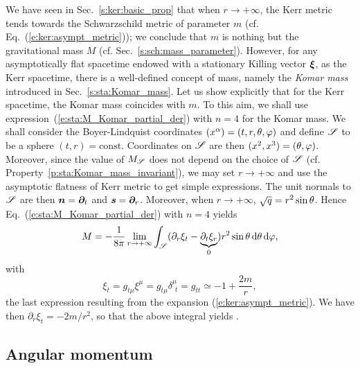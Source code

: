 We have seen in Sec.~\ref{s:ker:basic_prop} that when
$r\rightarrow +\infty$, the Kerr metric tends towards the Schwarzschild
metric of parameter $m$ (cf. Eq.~(\ref{e:ker:asympt_metric}));
we conclude that $m$ is nothing but the gravitational mass $M$ (cf.
Sec.~\ref{s:sch:mass_parameter}).
However, for any asymptotically flat spacetime endowed with
a stationary Killing vector $\bm{\xi}$, as the Kerr spacetime,
there is a well-defined concept of mass, namely the \emph{Komar mass}
introduced in Sec.~\ref{s:sta:Komar_mass}.
Let us show explicitly that for the Kerr spacetime, the Komar mass coincides with $m$.
To this aim, we shall use expression~(\ref{e:sta:M_Komar_partial_der}) with $n=4$
for the Komar mass. We shall consider the Boyer-Lindquist coordinates
$(x^\alpha) = (t,r,\theta,\varphi)$ and define $\mathscr{S}$ to be a sphere
$(t,r)=\mathrm{const}$. Coordinates on $\mathscr{S}$ are then
$(x^2,x^3)=(\theta,\varphi)$. Moreover, since the value of $M_{\mathscr{S}}$ does not depend on
the choice of $\mathscr{S}$ (cf. Property~\ref{p:sta:Komar_mass_invariant}),
we may set $r\rightarrow +\infty$ and use the
asymptotic flatness of Kerr metric to get simple expressions. The unit normals
to $\mathscr{S}$ are then $\bm{n} = \bm{\partial}_t$ and $\bm{s} = \bm{\partial}_r$. Moreover, when
$r\rightarrow +\infty$, $\sqrt{q} = r^2\sin\theta$. Hence Eq.~(\ref{e:sta:M_Komar_partial_der})
with $n=4$ yields
\[
    M = -\frac{1}{8\pi} \lim_{r\rightarrow +\infty}
        \int_{\mathscr{S}}
        (\partial_r \xi_t - \underbrace{\partial_t \xi_r}_{0} )
        r^2\sin\theta \, \mathrm{d}\theta\, \mathrm{d}\varphi ,
\]
with
\[
    \xi_t = g_{t\mu} \xi^\mu = g_{t\mu} \delta^\mu_{\ \, t}
        = g_{tt} \simeq - 1 + \frac{2m}{r} ,
\]
the last expression resulting from the expansion (\ref{e:ker:asympt_metric}).
We have then $\partial_r \xi_t = -2m/r^2$, so that the above integral yields
\be \label{e:ker:M_m}
     .
\ee


\subsection{Angular momentum} \label{s:ker:Komar_J}


